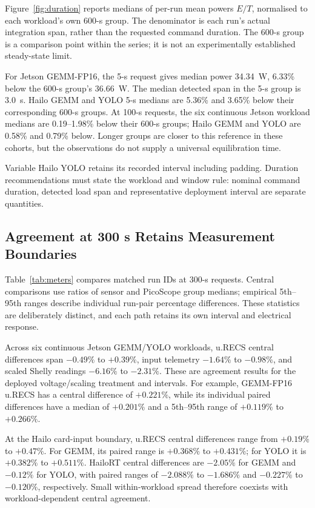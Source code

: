 Figure~\ref{fig:duration} reports medians of per-run mean powers $E/T$, normalised to each workload's own 600-s group. The denominator is each run's actual integration span, rather than the requested command duration. The 600-s group is a comparison point within the series; it is not an experimentally established steady-state limit.

For Jetson GEMM-FP16, the 5-s request gives median power 34.34~W, 6.33\% below the 600-s group's 36.66~W. The median detected span in the 5-s group is 3.0~s. Hailo GEMM and YOLO 5-s medians are 5.36\% and 3.65\% below their corresponding 600-s groups. At 100-s requests, the six continuous Jetson workload medians are 0.19--1.98\% below their 600-s groups; Hailo GEMM and YOLO are 0.58\% and 0.79\% below. Longer groups are closer to this reference in these cohorts, but the observations do not supply a universal equilibration time.

Variable Hailo YOLO retains its recorded interval including padding. Duration recommendations must state the workload and window rule: nominal command duration, detected load span and representative deployment interval are separate quantities.

\subsection{Agreement at 300 s Retains Measurement Boundaries}


Table~\ref{tab:meters} compares matched run IDs at 300-s requests. Central comparisons use ratios of sensor and PicoScope group medians; empirical 5th--95th ranges describe individual run-pair percentage differences. These statistics are deliberately distinct, and each path retains its own interval and electrical response.

Across six continuous Jetson GEMM/YOLO workloads, u.RECS central differences span $-0.49\%$ to $+0.39\%$, input telemetry $-1.64\%$ to $-0.98\%$, and scaled Shelly readings $-6.16\%$ to $-2.31\%$. These are agreement results for the deployed voltage/scaling treatment and intervals. For example, GEMM-FP16 u.RECS has a central difference of $+0.221\%$, while its individual paired differences have a median of $+0.201\%$ and a 5th--95th range of $+0.119\%$ to $+0.266\%$.

At the Hailo card-input boundary, u.RECS central differences range from $+0.19\%$ to $+0.47\%$. For GEMM, its paired range is $+0.368\%$ to $+0.431\%$; for YOLO it is $+0.382\%$ to $+0.511\%$. HailoRT central differences are $-2.05\%$ for GEMM and $-0.12\%$ for YOLO, with paired ranges of $-2.088\%$ to $-1.686\%$ and $-0.227\%$ to $-0.120\%$, respectively. Small within-workload spread therefore coexists with workload-dependent central agreement.

